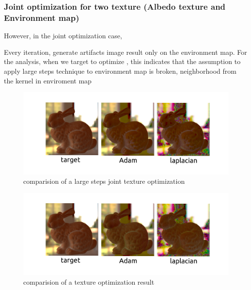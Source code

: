 \begin{table}[!h]
	\centering
	\caption{comparision of a large steps texture optimization}
	\label{table:a-texture-comparision-laplacian}
\end{table}

\subsubsection{Joint optimization for two texture (Albedo texture and Environment map)}

However, in the joint optimization case, 

Every iteration, generate artifacts image result only on the environment map. For the analysis, when we target to optimize , this indicates that the assumption to apply large steps technique to environment map is broken, neighborhood from the kernel in enviroment map

\begin{figure}[!h]
    \includegraphics[width=\textwidth]{figures/result-2.png}
    \caption{comparision of a large steps joint texture optimization}
    \label{fig:a-texture-comparision-joint}
\end{figure}

\begin{figure}[!h]
    \includegraphics[width=\textwidth]{figures/result-2-1.png}
    \caption{comparision of a texture optimization result}
    \label{fig:a-texture-comparision}
\end{figure}

